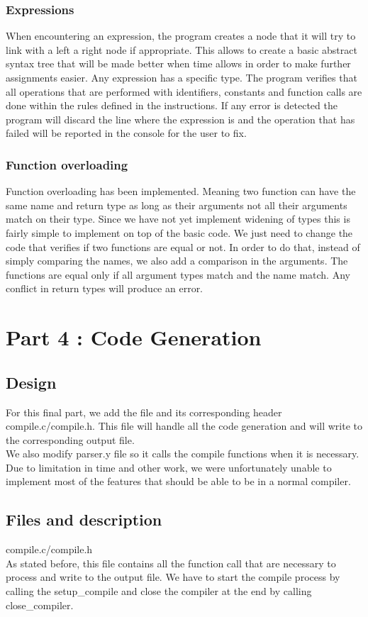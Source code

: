 \documentclass{article}
\begin{document}
\subsubsection{Expressions}
When encountering an expression, the program creates a node that it will try to link with a left a right node if appropriate. This allows to create a basic abstract syntax tree that will be made better when time allows in order to make further assignments easier. 
Any expression has a specific type. The program verifies that all operations that are performed with identifiers, constants and function calls are done within the rules defined in the instructions. 
If any error is detected the program will discard the line where the expression is and the operation that has failed will be reported in the console for the user to fix. 

\subsubsection{Function overloading}
Function overloading has been implemented. Meaning two function can have the same name and return type as long as their arguments not all their arguments match on their type. Since we have not yet implement widening of types this is fairly simple to implement on top of the basic code. We just need to change the code that verifies if two functions are equal or not. In order to do that, instead of simply comparing the names, we also add a comparison in the arguments. The functions are equal only if all argument types match and the name match. Any conflict in return types will produce an error. 



\section{Part 4 : Code Generation}
\subsection{Design}
For this final part, we add the file and its corresponding header compile.c/compile.h. This file will handle all the code generation and will write to the corresponding output file. \\
We also modify parser.y file so it calls the compile functions when it is necessary. Due to limitation in time and other work, we were unfortunately unable to implement most of the features that should be able to be in a normal compiler. 
\subsection{Files and description}
\label{definition}
\begin{description}
\item{compile.c/compile.h}\\
As stated before, this file contains all the function call that are necessary to process and write to the output file. We have to start the compile process by calling the setup\_compile and close the compiler at the end by calling close\_compiler. 
\end{description}
\end{document}
